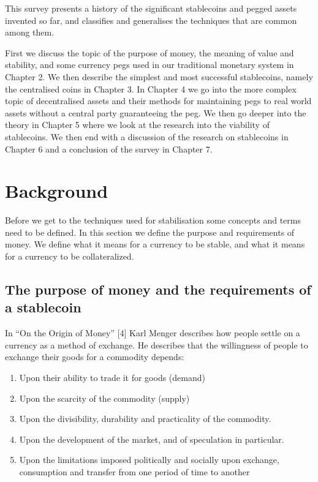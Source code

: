 \documentclass[english,]{IEEEtran}
\providecommand{\tightlist}{%
  \setlength{\itemsep}{0pt}\setlength{\parskip}{0pt}}
\begin{document}
This survey presents a history of the significant stablecoins and pegged
assets invented so far, and classifies and generalises the techniques
that are common among them.

First we discuss the topic of the purpose of money, the meaning of value
and stability, and some currency pegs used in our traditional monetary
system in Chapter 2. We then describe the simplest and most successful
stablecoins, namely the centralised coins in Chapter 3. In Chapter 4 we
go into the more complex topic of decentralised assets and their methods
for maintaining pegs to real world assets without a central party
guaranteeing the peg. We then go deeper into the theory in Chapter 5
where we look at the research into the viability of stablecoins. We then
end with a discussion of the research on stablecoins in Chapter 6 and a
conclusion of the survey in Chapter 7.

\section{Background}\label{background}

Before we get to the techniques used for stabilisation some concepts and
terms need to be defined. In this section we define the purpose and
requirements of money. We define what it means for a currency to be
stable, and what it means for a currency to be collateralized.

\subsection{The purpose of money and the requirements of a
stablecoin}\label{the-purpose-of-money-and-the-requirements-of-a-stablecoin}

In ``On the Origin of Money'' {[}4{]} Karl Menger describes how people
settle on a currency as a method of exchange. He describes that the
willingness of people to exchange their goods for a commodity depends:

\begin{enumerate}
\def\labelenumi{\arabic{enumi}.}
\tightlist
\item
  Upon their ability to trade it for goods (demand)
\item
  Upon the scarcity of the commodity (supply)
\item
  Upon the divisibility, durability and practicality of the commodity.
\item
  Upon the development of the market, and of speculation in particular.
\item
  Upon the limitations imposed politically and socially upon exchange,
  consumption and transfer from one period of time to another
\end{enumerate}
\end{document}
